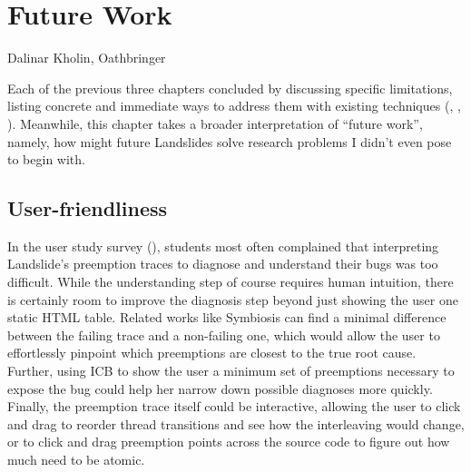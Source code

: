 \chapter{Future Work}
\label{chap:warpzone}
{Dalinar Kholin, Oathbringer}

Each of the previous three chapters concluded by
discussing specific limitations,
listing concrete and immediate ways to address them
with existing techniques
(\sect{\ref{sec:quicksand-discussion}},
\sect{\ref{sec:education-discussion}},
\sect{\ref{sec:tm-discussion}}).
Meanwhile, this chapter takes a broader interpretation of ``future work'',
namely,
how might future Landslides solve research problems I didn't even pose to begin with.

\section{User-friendliness}

In the user study survey (\sect{\ref{sec:education-eval-survey}}),
students most often complained
that interpreting Landslide's preemption traces to diagnose and understand their bugs was too difficult.
While the understanding step of course requires human intuition,
there is certainly room to improve the diagnosis step beyond just showing the user one static HTML table.
Related works like Symbiosis \cite{symbiosis} can find a minimal difference between the failing trace and a non-failing one,
which would allow the user to effortlessly pinpoint which preemptions are closest to the true root cause.
Further, using ICB \cite{chess-icb} to show the user a minimum set of preemptions necessary to expose the bug
could help her narrow down possible diagnoses more quickly.
Finally, the preemption trace itself could be interactive,
allowing the user to click and drag to reorder thread transitions and see how the interleaving would change,
or to click and drag preemption points across the source code to figure out how much need to be atomic.

